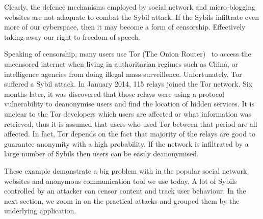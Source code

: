 Clearly, the defence mechanisms employed by social network and micro-blogging
websites are not adaquate to combat the Sybil attack. If the Sybils infiltrate
even more of our cyberspace, then it may become a form of censorship.
Effectively taking away our right to freedom of speech.

Speaking of censorship, many users use Tor (The Onion
Router)~\cite{dingledine2004tor} to access the uncensored internet when living
in authoritarian regimes such as China, or intelligence agencies from doing
illegal mass surveillence. Unfortunately, Tor suffered a Sybil attack. In
January 2014, 115 relays joined the Tor network. Six months later, it was
discovered that those relays were using a protocol vulnerability to deanonymise
users and find the location of hidden services. It is unclear to the Tor
developers which users are affected or what information was retrieved, thus it
is assumed that users who used Tor between that period are all
affected\cite{torsybil}. In fact, Tor depends on the fact that majority of the
relays are good to guarantee anonymity with a high probability. If the network
is infiltrated by a large number of Sybils then users can be easily
deanonymised.

These example demonstrate a big problem with in the popular social network
websites and anonymous communication tool we use today. A lot of Sybils
controlled by an attacker can censor content and track user behaviour. In the
next section, we zoom in on the practical attacks and grouped them by the
underlying application.

